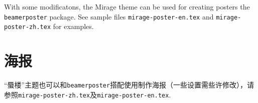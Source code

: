 \documentclass{article}
\begin{document}
\begin{paracol}{2}
With some modificatons, the Mirage theme can be used for creating posters  the \texttt{beamerposter} package. See sample files \texttt{mirage-poster-en.tex} and \texttt{mirage-poster-zh.tex} for examples.

\switchcolumn

\section{海报}

“蜃楼”主题也可以和\texttt{beamerposter}搭配使用制作海报（一些设置需些许修改），请参照\texttt{mirage-poster-zh.tex}及\texttt{mirage-poster-en.tex}.

\switchcolumn*

\begin{center}
\end{center}

\switchcolumn


\end{paracol}
\end{document}
